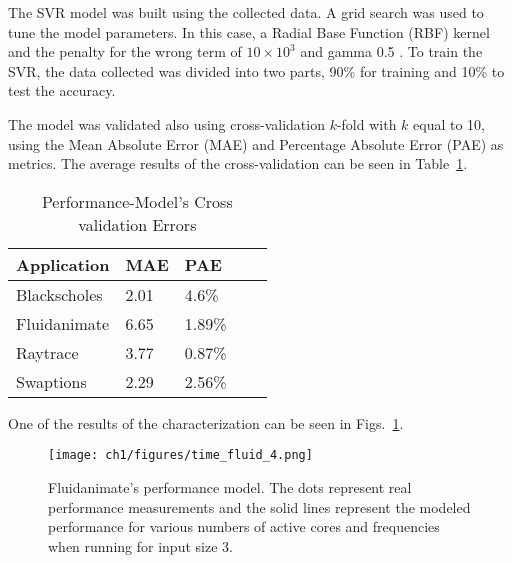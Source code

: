 The SVR model was built using the collected data. A grid search was used to tune the model parameters. In this case, a Radial Base Function (RBF) kernel and the penalty for the wrong term of $10\times10^3$ and gamma 0.5 \cite{scikit-learn}. To train the SVR, the data collected was divided into two parts, 90\% for training and 10\% to test the accuracy.

The model was validated also using cross-validation $k$-fold with $k$ equal to 10, using the Mean Absolute Error (MAE) and Percentage Absolute Error (PAE) as metrics. The average results of the cross-validation can be seen in Table~\ref{tab:svr_evaluation}.

\begin{table}[H]
\centering
\caption{Performance-Model's Cross validation Errors}
\label{tab:svr_evaluation}
\begin{tabular}{|l|l|l|l|l|}
\hline
Application  & MAE & PAE \\ \hline
\hline
Blackscholes & 2.01  & 4.6\% \\ \hline
Fluidanimate & 6.65  & 1.89\% \\ \hline
Raytrace  & 3.77  & 0.87\% \\ \hline
Swaptions & 2.29  & 2.56\% \\ \hline
\end{tabular}
\end{table}

One of the results of the characterization can be seen in Figs.~\ref{fig:svr_time2}.

\begin{figure}[H]
	\centerline{\texttt{[image: ch1/figures/time\_fluid\_4.png]}}
    \caption{Fluidanimate's performance model. The dots represent real performance measurements and the solid lines represent the modeled performance for various numbers of active cores and frequencies when running for input size 3.}
	\label{fig:svr_time2}
\end{figure}




